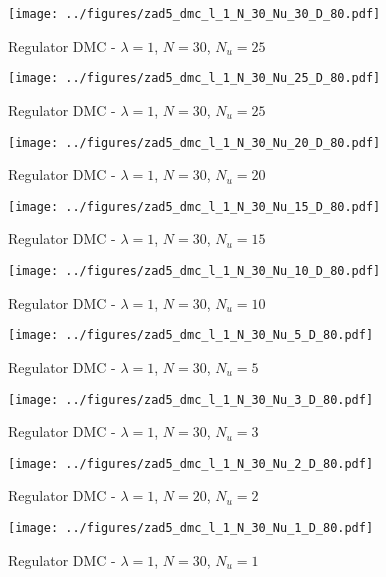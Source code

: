 \documentclass[a4paper,titlepage,11pt,floatssmall]{mwrep}
\begin{document}
\bigskip
\begin{figure}[H]
\centering
\texttt{[image: ../figures/zad5\_dmc\_l\_1\_N\_30\_Nu\_30\_D\_80.pdf]}
\caption{Regulator DMC - $\lambda = 1$, $N = 30$, $N_{u} = 25$}
\end{figure}

\newpage

\begin{figure}[H]
\centering
\texttt{[image: ../figures/zad5\_dmc\_l\_1\_N\_30\_Nu\_25\_D\_80.pdf]}
\caption{Regulator DMC - $\lambda = 1$, $N = 30$, $N_{u} = 25$}
\end{figure}

\begin{figure}[H]
\centering
\texttt{[image: ../figures/zad5\_dmc\_l\_1\_N\_30\_Nu\_20\_D\_80.pdf]}
\caption{Regulator DMC - $\lambda = 1$, $N = 30$, $N_{u} = 20$}
\end{figure}

\begin{figure}[H]
\centering
\texttt{[image: ../figures/zad5\_dmc\_l\_1\_N\_30\_Nu\_15\_D\_80.pdf]}
\caption{Regulator DMC - $\lambda = 1$, $N = 30$, $N_{u} = 15$}
\end{figure}

\begin{figure}[H]
\centering
\texttt{[image: ../figures/zad5\_dmc\_l\_1\_N\_30\_Nu\_10\_D\_80.pdf]}
\caption{Regulator DMC - $\lambda = 1$, $N = 30$, $N_{u} = 10$}
\end{figure}

\begin{figure}[H]
\centering
\texttt{[image: ../figures/zad5\_dmc\_l\_1\_N\_30\_Nu\_5\_D\_80.pdf]}
\caption{Regulator DMC - $\lambda = 1$, $N = 30$, $N_{u} = 5$}
\end{figure}

\begin{figure}[H]
\centering
\texttt{[image: ../figures/zad5\_dmc\_l\_1\_N\_30\_Nu\_3\_D\_80.pdf]}
\caption{Regulator DMC - $\lambda = 1$, $N = 30$, $N_{u} = 3$}
\end{figure}

\begin{figure}[H]
\centering
\texttt{[image: ../figures/zad5\_dmc\_l\_1\_N\_30\_Nu\_2\_D\_80.pdf]}
\caption{Regulator DMC - $\lambda = 1$, $N = 20$, $N_{u} = 2$}
\end{figure}


\begin{figure}[H]
\centering
\texttt{[image: ../figures/zad5\_dmc\_l\_1\_N\_30\_Nu\_1\_D\_80.pdf]}
\caption{Regulator DMC - $\lambda = 1$, $N = 30$, $N_{u} = 1$}
\end{figure}
\newpage
\end{document}

